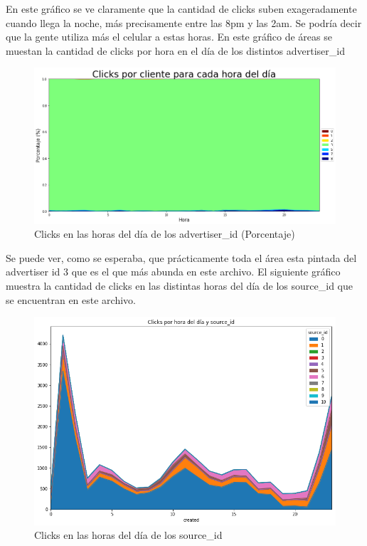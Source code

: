 \documentclass[a4paper, 12pt]{article}
\begin{document}
		 En este gráfico se ve claramente que la cantidad de clicks suben exageradamente cuando llega la noche, más precisamente entre las 8pm y las 2am. Se podría decir que la gente utiliza más el celular a estas horas.
		\newline
		\newline
		 En este gráfico de áreas se muestan la cantidad de clicks por hora en el día de los distintos advertiser\_id
	
		\FloatBarrier
		\begin{figure}[h]
			\centering
			\includegraphics[scale=0.37]{images/clicks/clicks_advertiser_id_hours_persentage.png}
			\caption{Clicks en las horas del día de los advertiser\_id (Porcentaje)}
		\end{figure}
		\FloatBarrier



		 Se puede ver, como se esperaba, que prácticamente toda el área esta pintada del advertiser id 3 que es el que más abunda en este archivo.
		\newline
		\newline
		 El siguiente gráfico muestra la cantidad de clicks en las distintas horas del día de los source\_id que se encuentran en este archivo.

		\FloatBarrier
		\begin{figure}[h]
			\centering
			\includegraphics[width=\textwidth]{images/clicks/clicks_source_id_hours.png}
			\caption{Clicks en las horas del día de los source\_id}
		\end{figure}
		\FloatBarrier
\end{document}
